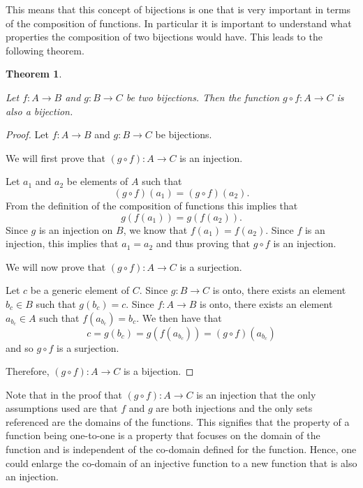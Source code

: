 \documentclass[
]{book}
\newtheorem{theorem}{Theorem}[chapter]
\theoremstyle{definition}
\theoremstyle{definition}
\theoremstyle{definition}
\theoremstyle{definition}
\theoremstyle{remark}
\begin{document}
This means that this concept of bijections is one that is very important in terms of the composition of functions. In particular it is important to understand what properties the composition of two bijections would have. This leads to the following theorem.

\begin{theorem}
\protect\hypertarget{thm:bijection2}{}\label{thm:bijection2}

Let \(f:A \rightarrow B\) and \(g:B \rightarrow C\) be two bijections. Then the function \(g\circ f : A \rightarrow C\) is also a bijection.

\end{theorem}

\begin{proof}

Let \(f:A \rightarrow B\) and \(g:B\rightarrow C\) be bijections.

We will first prove that \((g\circ f):A\rightarrow C\) is an injection.

Let \(a_1\) and \(a_2\) be elements of \(A\) such that \[(g\circ f)(a_1)=(g\circ f)(a_2).\]
From the definition of the composition of functions this implies that \[g\left( f(a_1)\right) = g\left(f(a_2)\right).\]
Since \(g\) is an injection on \(B\), we know that \(f(a_1)=f(a_2)\). Since \(f\) is an injection, this implies that \(a_1=a_2\) and thus proving that \(g\circ f\) is an injection.

We will now prove that \((g\circ f):A\rightarrow C\) is a surjection.

Let \(c\) be a generic element of \(C\). Since \(g:B\rightarrow C\) is onto, there exists an element \(b_c\in B\) such that \(g(b_c)=c\). Since \(f:A \rightarrow B\) is onto, there exists an element \(a_{b_c}\in A\) such that \(f\left(a_{b_c}\right) = b_c\). We then have that \[c=g(b_c)=g\left( f\left(a_{b_c}\right) \right) = (g \circ f) \left( a_{b_c}\right)\] and so \(g\circ f\) is a surjection.

Therefore, \((g\circ f):A \rightarrow C\) is a bijection.

\end{proof}

Note that in the proof that \((g\circ f):A \rightarrow C\) is an injection that the only assumptions used are that \(f\) and \(g\) are both injections and the only sets referenced are the domains of the functions. This signifies that the property of a function being one-to-one is a property that focuses on the domain of the function and is independent of the co-domain defined for the function. Hence, one could enlarge the co-domain of an injective function to a new function that is also an injection.
\end{document}
